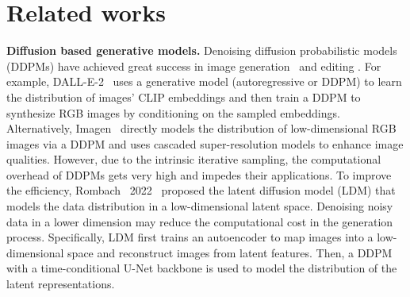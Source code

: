 \documentclass[10pt,twocolumn,letterpaper]{article}
\newcommand{\myPara}[1]{\vspace{6pt}\noindent\textbf{#1}}
\begin{document}
 
\section{Related works}
\myPara{Diffusion based generative models.} Denoising diffusion probabilistic models (DDPMs)  have achieved great success in image generation~\cite{ho_denoising_2020, song_score-based_2021} and editing \cite{lugmayr_repaint_nodate, meng_sdedit_2022, hertz_prompt--prompt_2022, liew_magicmix_2022, kawar_imagic_2022}. For example, DALL-E-2~\cite{dalle2} uses a generative model (\eg autoregressive or DDPM) to learn the distribution of images' CLIP embeddings and then train a DDPM to synthesize RGB images by conditioning on the sampled embeddings. Alternatively, Imagen~\cite{imagen} directly models the distribution of low-dimensional RGB images via a DDPM and uses cascaded super-resolution models to   enhance image qualities. 
However, due to the intrinsic   iterative sampling, the computational overhead of DDPMs gets very high and impedes their applications. To improve the efficiency, Rombach \etal~2022~\cite{rombach_high-resolution_2022} proposed the latent diffusion model (LDM) that models the data distribution in a low-dimensional latent space. 
Denoising noisy data in a lower dimension may reduce the computational cost in the generation process. 
Specifically, LDM first trains an autoencoder  to map images  into a low-dimensional space and reconstruct images from latent features. Then, a DDPM with a time-conditional U-Net backbone is used to model the distribution of the latent representations.
\end{document}
